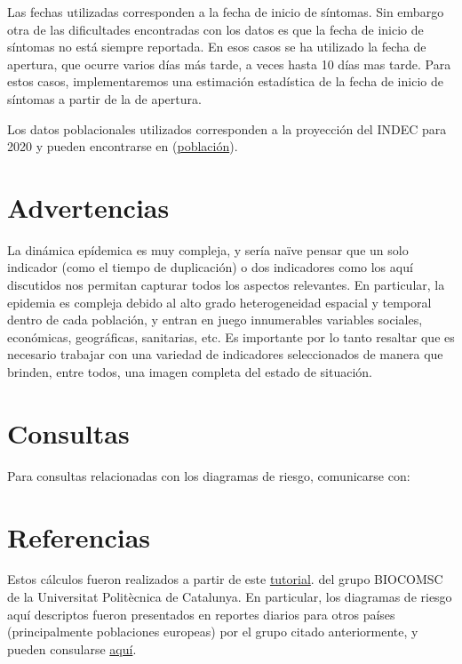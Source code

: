 \documentclass[12pt,a4paper]{article}
\begin{document}
Las fechas utilizadas corresponden a la fecha de inicio de síntomas. Sin embargo otra de las dificultades encontradas con los datos es que la fecha de inicio de síntomas no está siempre reportada. En esos casos se ha utilizado la fecha de apertura, que ocurre varios días más tarde, a veces hasta 10 días mas tarde. Para estos casos, implementaremos una estimación estadística de la fecha de inicio de síntomas a partir de la de apertura.

Los datos poblacionales utilizados corresponden a la proyección del INDEC para 2020 y pueden encontrarse en (\hyperref[https://sitioanterior.indec.gob.ar/nivel4_default.asp?id_tema_1=2&id_tema_2=24&id_tema_3=119]{población}).

\section*{Advertencias}
La dinámica epídemica es muy compleja, y sería na\"{i}ve pensar que un solo indicador 
(como el tiempo de duplicación) o dos indicadores como los aquí discutidos nos permitan capturar todos los aspectos relevantes. En particular, la epidemia es compleja debido al alto grado heterogeneidad espacial y temporal dentro de cada población, y entran en juego 
innumerables variables sociales, económicas, geográficas, sanitarias, etc.
Es importante por lo tanto resaltar que es necesario trabajar con una variedad de indicadores seleccionados de manera que brinden, entre todos, una imagen completa del estado de situación. 


\section*{Consultas}
Para consultas relacionadas con los diagramas de riesgo, comunicarse con:\\

\noindent{}

\section*{Referencias}
Estos cálculos fueron realizados a partir de 
este \hyperref[https://biocomsc.upc.edu/en/shared/avaluacio_risc.pdf]{tutorial}.
del grupo BIOCOMSC de la Universitat Politècnica de Catalunya. 
En particular, los diagramas de riesgo aquí descriptos fueron presentados
en reportes diarios para otros países (principalmente poblaciones europeas) 
por el grupo citado anteriormente, y pueden consularse
\hyperref[https://biocomsc.upc.edu/en/covid-19]{aquí}.
\end{document}

